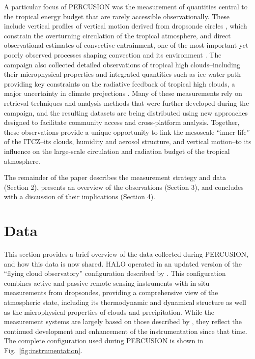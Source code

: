 \documentclass{article}
\begin{document}
A particular focus of PERCUSION was the measurement of quantities central to the tropical energy budget that are rarely accessible observationally. These include vertical profiles of vertical motion derived from dropsonde circles \citep{bonyMeasuringAreaAveragedVertical2019, gloecknerBEACHBarbadosEastern2025}, which constrain the overturning circulation of the tropical atmosphere, and direct observational estimates of convective entrainment, one of the most important yet poorly observed processes shaping convection and its environment \citep{sherwoodSpreadModelClimate2014}. The campaign also collected detailed observations of tropical high clouds--including their microphysical properties and integrated quantities such as ice water path--providing key constraints on the radiative feedback of tropical high clouds, a major uncertainty in climate projections \citep{sherwoodAssessmentEarthClimate2020}.
Many of these measurements rely on retrieval techniques and analysis methods that were further developed during the campaign, and the resulting datasets are being distributed using new approaches designed to facilitate community access and cross-platform analysis.
Together, these observations provide a unique opportunity to link the mesoscale “inner life” of the ITCZ--its clouds, humidity and aerosol structure, and vertical motion--to its influence on the large-scale circulation and radiation budget of the tropical atmosphere.

The remainder of the paper describes the measurement strategy and data (Section 2), presents an overview of the observations (Section 3), and concludes with a discussion of their implications (Section 4).

\section{Data}


This section provides a brief overview of the data collected during PERCUSION, and how this data is now shared. HALO operated in an updated version of the “flying cloud observatory” configuration described by \cite{stevensHighAltitudeLongRangeAircraft2019}. This configuration combines active and passive remote-sensing instruments with in situ measurements from dropsondes, providing a comprehensive view of the atmospheric state, including its thermodynamic and dynamical structure as well as the microphysical properties of clouds and precipitation. While the measurement systems are largely based on those described by \cite{stevensHighAltitudeLongRangeAircraft2019}, they reflect the continued development and enhancement of the instrumentation since that time. The complete configuration used during PERCUSION is shown in Fig.~\ref{fig:instrumentation}.
\end{document}

